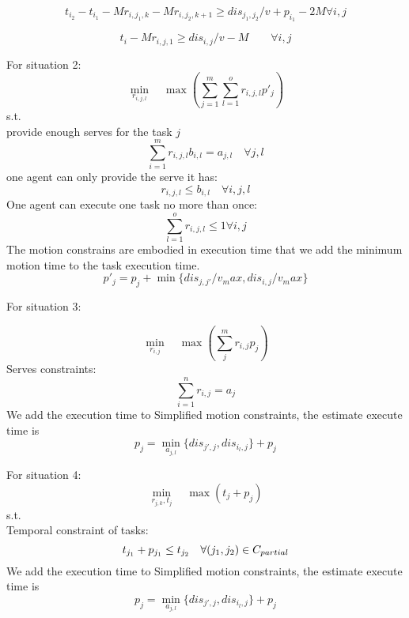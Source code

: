 \documentclass[10pt, Oct]{IEEEtran}
\begin{document}
 \begin{equation}
 t_{i_2}-t_{i_1} -M r_{i,j_1,k}-Mr_{i,j_2,k+1}  \geq dis_{j_1,j_2}/v+p_{i_1}-2M   \forall i,j
 \end{equation}
 
 \begin{equation}
 t_{i} -M r_{i,j,1} \geq dis_{i,j}/v-M \qquad  \forall i,j
 \end{equation}
 
For situation 2:
 $$\min_{r_{i,j,l}} \quad \max(\sum_{j=1}^{m}\sum_{l=1}^{o}r_{i,j,l}p'_j)$$
s.t.\\
provide enough serves for the task $j$ 
\begin{equation}
\sum_{i=1}^{m}r_{i,j,l}b_{i,l}= a_{j,l}   \quad \forall j,l 
\end{equation}
one agent can only provide the serve it has:
\begin{equation}
r_{i,j,l}\leq b_{i,l}   \quad \forall i,j,l
\end{equation}
One agent can execute one task no more than once:
\begin{equation}
\sum_{l=1}^{o}r_{i,j,l} \leq 1   \forall i,j
\end{equation}
The motion constrains are embodied in execution time that we add the minimum motion time to the task execution time.
\begin{equation}
 p'_j=p_j+\min\{dis_{j,j'}/v_max,dis_{i,j}/v_max\}
\end{equation}


For situation 3:

$$\min_{r_{i,j}} \quad \max(\sum_{j}^{m}r_{i,j}p_j)$$
Serves constraints:
\begin{equation}
\sum_{i=1}^{n}r_{i,j}=a_j
\end{equation}
We add the execution time to Simplified motion constraints, the estimate execute time is 
\begin{equation}
p_j=\min_{a_{j,l}}\{dis_{j',j},dis_{i_l,j}\}+p_j
\end{equation}

For situation 4:
$$\min_{r_{j,k}, t_j} \quad \max(t_j+p_j)$$
s.t.\\

Temporal constraint of tasks:
\begin{equation}
t_{j_1}+p_{j_1}\leq t_{j_2} \quad  \forall (j_1,j_2)\in C_{partial}\\
\end{equation}
We add the execution time to Simplified motion constraints, the estimate execute time is 
\begin{equation}
p_j=\min_{a_{j,l}}\{dis_{j',j},dis_{i_l,j}\}+p_j
\end{equation}
\end{document}
